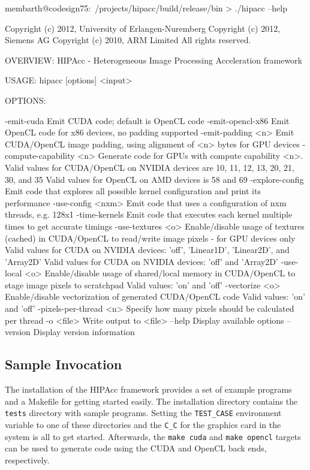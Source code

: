 \begin{code}
membarth@codesign75:~/projects/hipacc/build/release/bin > ./hipacc --help

Copyright (c) 2012, University of Erlangen-Nuremberg
Copyright (c) 2012, Siemens AG
Copyright (c) 2010, ARM Limited
All rights reserved.

OVERVIEW: HIPAcc - Heterogeneous Image Processing Acceleration framework

USAGE:  hipacc [options] <input>

OPTIONS:

  -emit-cuda              Emit CUDA code; default is OpenCL code
  -emit-opencl-x86        Emit OpenCL code for x86 devices, no padding supported
  -emit-padding <n>       Emit CUDA/OpenCL image padding, using alignment of <n> bytes for GPU devices
  -compute-capability <n> Generate code for GPUs with compute capability <n>.
                          Valid values for CUDA/OpenCL on NVIDIA devices are 10, 11, 12, 13, 20, 21, 30, and 35
                          Valid values for OpenCL on AMD devices is 58 and 69
  -explore-config         Emit code that explores all possible kernel configuration and print its performance
  -use-config <nxm>       Emit code that uses a configuration of nxm threads, e.g. 128x1
  -time-kernels           Emit code that executes each kernel multiple times to get accurate timings
  -use-textures <o>       Enable/disable usage of textures (cached) in CUDA/OpenCL to read/write image pixels - for GPU devices only
                          Valid values for CUDA on NVIDIA devices: 'off', 'Linear1D', 'Linear2D', and 'Array2D'
                          Valid values for CUDA on NVIDIA devices: 'off' and 'Array2D'
  -use-local <o>          Enable/disable usage of shared/local memory in CUDA/OpenCL to stage image pixels to scratchpad
                          Valid values: 'on' and 'off'
  -vectorize <o>          Enable/disable vectorization of generated CUDA/OpenCL code
                          Valid values: 'on' and 'off'
  -pixels-per-thread <n>  Specify how many pixels should be calculated per thread
  -o <file>               Write output to <file>
  --help                  Display available options
  --version               Display version information
\end{code}


\subsection{Sample Invocation}
The installation of the \ac{HIPAcc} framework provides a set of example programs and a Makefile for getting started easily.
The installation directory contains the \verb|tests| directory with sample programs.
Setting the {\tt TEST\_CASE} environment variable to one of these directories and the {\tt C\_C} for the graphics card in the system is all to get started.
Afterwards, the \verb|make cuda| and \verb|make opencl| targets can be used to generate code using the CUDA and OpenCL back ends, respectively.

